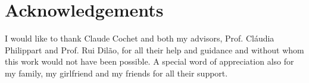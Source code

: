 
\section*{Acknowledgements}
I would like to thank Claude Cochet and both my advisors, Prof. Cláudia Philippart and Prof. Rui Dilão, for all their help and guidance and without whom this work would not have been possible. A special word of appreciation also for my family, my girlfriend and my friends for all their support.

